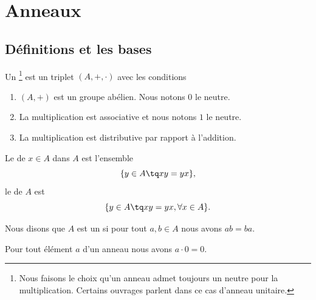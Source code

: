 \section{Anneaux}

\subsection{Définitions et les bases}

\begin{definition}     \label{DefHXJUooKoovob}
    Un \footnote{Nous faisons le choix qu'un anneau admet toujours un neutre pour la multiplication. Certains ouvrages parlent dans ce cas d'anneau unitaire.} est un triplet \( (A,+,\cdot)\) avec les conditions
    \begin{enumerate}
        \item
            \( (A,+)\) est un groupe abélien. Nous notons \( 0\) le neutre.
        \item
            La multiplication est associative et nous notons \( 1\) le neutre.
        \item
            La multiplication est distributive par rapport à l'addition.
    \end{enumerate}
\end{definition}

\begin{definition}
    Le  de \( x\in A\) dans \( A\) est l'ensemble
    \begin{equation}
        \{ y\in A\tq xy=yx \},
    \end{equation}
    le  de \( A\) est
    \begin{equation}
        \{ y\in A\tq xy=yx,\forall x\in A \}.
    \end{equation}
\end{definition}

\begin{definition}
    Nous disons que \( A\) est un  si pour tout \( a,b\in A\) nous avons \( ab=ba\).
\end{definition}

\begin{lemma}       \label{LEMooVUSMooWisQpD}
    Pour tout élément \( a\) d'un anneau nous avons \( a\cdot 0=0\).
\end{lemma}

